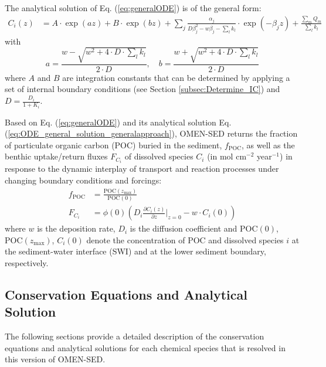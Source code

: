 \documentclass[gmd, manuscript]{copernicus}
\begin{document}
The analytical solution of Eq. (\ref{eq:generalODE}) is of the general form:
\begin{align}
 C_i(z) &= A \cdot \exp(az) + B \cdot \exp(bz) + \sum_j \frac{\alpha_j}{D \beta_j^2-w\beta_j- \sum_l k_l}\cdot \exp(-\beta_j z) + \frac{\sum_m Q_m}{\sum_l k_l} \label{eq:ODE_general_solution_generalapproach}
\end{align}
with 
\begin{equation} 
 a = \frac{w - \sqrt{w^2+4\cdot D\cdot \sum_l k_l}}{2\cdot D}, \quad b = \frac{w + \sqrt{w^2+4\cdot D\cdot \sum_l k_l}}{2\cdot D}
\end{equation}
where $A$ and $B$ are integration constants that can be determined by applying a set of internal boundary conditions (see Section \ref{subsec:Determine_IC}) 
and $D = \frac{D_i}{1+K_i}$.

Based on Eq. (\ref{eq:generalODE}) and its analytical solution Eq. (\ref{eq:ODE_general_solution_generalapproach}), OMEN-SED returns the fraction of particulate organic carbon (POC) buried in the sediment, 
$f_{\mathrm{POC}}$, as well as the benthic uptake/return fluxes $F_{C_i}$ of dissolved species $C_i$ (in mol cm$^{-2}$ year$^{-1}$) in response to the dynamic interplay of transport and reaction processes under changing boundary conditions and forcings:
\begin{align}
f_{\mathrm{POC}} &= \frac{\mathrm{POC}(z_\mathrm{max})}{\mathrm{POC}(0)} \label{f_POC_pres}\\
F_{C_i} &= \phi(0) \left(D_i \frac{\partial C_i(z)}{\partial z}\bigg\rvert_{z=0} - w \cdot C_i(0) \right) \label{Eq:F_Ci_SWIflux}
\end{align}
where $w$ is the deposition rate, $D_i$ is the diffusion coefficient and $\mathrm{POC}(0)$, $\mathrm{POC}(z_\mathrm{max})$, $C_i(0)$ denote the concentration of POC and dissolved species $i$ at the sediment-water interface (SWI) and 
at the lower sediment boundary, respectively.


\subsection{Conservation Equations and Analytical Solution}\label{subsec:ReactionNetwork}
The following sections provide a detailed description of the conservation equations and analytical solutions for each chemical species that is resolved in this version of OMEN-SED.
\end{document}

